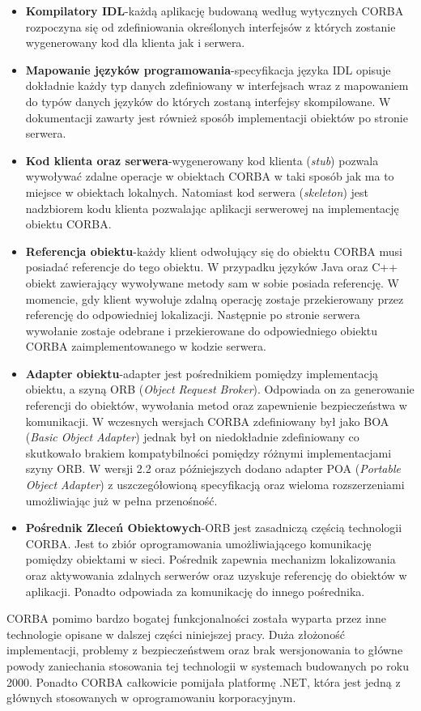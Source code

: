 \begin{itemize}
  \item \textbf{Kompilatory IDL}-każdą aplikację budowaną według wytycznych CORBA rozpoczyna się od zdefiniowania określonych interfejsów z których zostanie wygenerowany kod dla klienta jak i serwera.
  \item \textbf{Mapowanie języków programowania}-specyfikacja języka IDL opisuje dokładnie każdy typ danych zdefiniowany w interfejsach wraz z mapowaniem do typów danych języków do których zostaną interfejsy skompilowane. W dokumentacji zawarty jest również sposób implementacji obiektów po stronie serwera.
  \item \textbf{Kod klienta oraz serwera}-wygenerowany kod klienta (\textit{stub}) pozwala wywoływać zdalne operacje w obiektach CORBA w taki sposób jak ma to miejsce w obiektach lokalnych. Natomiast kod serwera (\textit{skeleton}) jest nadzbiorem kodu klienta pozwalając aplikacji serwerowej na implementację obiektu CORBA\@.
  \item \textbf{Referencja obiektu}-każdy klient odwołujący się do obiektu CORBA musi posiadać referencje do tego obiektu. W przypadku języków Java oraz C++ obiekt zawierający wywoływane metody sam w sobie posiada referencję. W momencie, gdy klient wywołuje zdalną operację zostaje przekierowany przez referencję do odpowiedniej lokalizacji. Następnie po stronie serwera wywołanie zostaje odebrane i przekierowane do odpowiedniego obiektu CORBA zaimplementowanego w kodzie serwera.
  \item \textbf{Adapter obiektu}-adapter jest pośrednikiem pomiędzy implementacją obiektu, a szyną ORB (\textit{Object Request Broker}). Odpowiada on za generowanie referencji do obiektów, wywołania metod oraz zapewnienie bezpieczeństwa w komunikacji. W wczesnych wersjach CORBA zdefiniowany był jako BOA (\textit{Basic Object Adapter}) jednak był on niedokładnie zdefiniowany co skutkowało brakiem kompatybilności pomiędzy różnymi implementacjami szyny ORB\@. W wersji 2.2 oraz późniejszych dodano adapter POA (\textit{Portable Object Adapter}) z uszczegółowioną specyfikacją oraz wieloma rozszerzeniami umożliwiając już w pełna przenośność.
  \item \textbf{Pośrednik Zleceń Obiektowych}-ORB jest zasadniczą częścią technologii CORBA\@. Jest to zbiór oprogramowania umożliwiającego komunikację pomiędzy obiektami w sieci. Pośrednik zapewnia mechanizm lokalizowania oraz aktywowania zdalnych serwerów oraz uzyskuje referencję do obiektów w aplikacji. Ponadto odpowiada za komunikację do innego pośrednika.
\end{itemize}
CORBA pomimo bardzo bogatej funkcjonalności została wyparta przez inne technologie opisane w dalszej części niniejszej pracy. Duża złożoność implementacji, problemy z bezpieczeństwem oraz brak wersjonowania to główne powody zaniechania stosowania tej technologii w systemach budowanych po roku 2000. Ponadto CORBA całkowicie pomijała platformę .NET, która jest jedną z głównych stosowanych w oprogramowaniu korporacyjnym.

